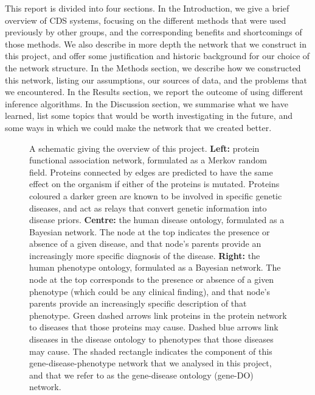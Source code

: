 \documentclass[11pt]{article}
\begin{document}
This report is divided into four sections. In the Introduction, we give a brief overview of CDS systems, focusing on the different methods that were used previously by other groups, and the corresponding benefits and shortcomings of those methods. We also describe in more depth the network that we construct in this project, and offer some justification and historic background for our choice of the network structure. In the Methods section, we describe how we constructed this network, listing our assumptions, our sources of data, and the problems that we encountered. In the Results section, we report the outcome of using different inference algorithms. In the Discussion section, we summarise what we have learned, list some topics that would be worth investigating in the future, and some ways in which we could make the network that we created better. 


\begin{figure} %
\centering
\caption{
A schematic giving the overview of this project. \textbf{Left:} protein functional association network, formulated as a Merkov random field. Proteins connected by edges are predicted to have the same effect on the organism if either of the proteins is mutated. Proteins coloured a darker green are known to be involved in specific genetic diseases, and act as relays that convert genetic information into disease priors. \textbf{Centre:} the human disease ontology, formulated as a Bayesian network. The node at the top indicates the presence or absence of a given disease, and that node's parents provide an increasingly more specific diagnosis of the disease. \textbf{Right:} the human phenotype ontology, formulated as a Bayesian network. The node at the top corresponds to the presence or absence of a given phenotype (which could be any clinical finding), and that node's parents provide an increasingly specific description of that phenotype. Green dashed arrows link proteins in the protein network to diseases that those proteins may cause. Dashed blue arrows link diseases in the disease ontology to phenotypes that those diseases may cause. The shaded rectangle indicates the component of this gene-disease-phenotype network that we analysed in this project, and that we refer to as the gene-disease ontology (gene-DO) network.
}
\label{fig:gene-disease-phenotype}
\end{figure}
\end{document}
